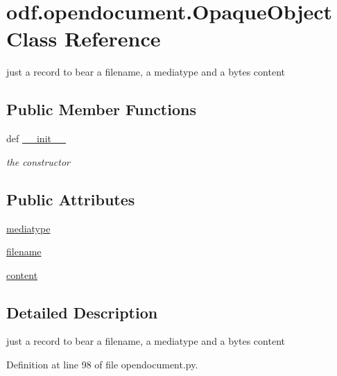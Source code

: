 \hypertarget{classodf_1_1opendocument_1_1OpaqueObject}{\section{odf.\+opendocument.\+Opaque\+Object Class Reference}
\label{classodf_1_1opendocument_1_1OpaqueObject}
}


just a record to bear a filename, a mediatype and a bytes content  


\subsection*{Public Member Functions}
\begin{DoxyCompactItemize}
\item 
def \hyperlink{classodf_1_1opendocument_1_1OpaqueObject_a554252db63a883d6ff087f78a22ac880}{\+\_\+\+\_\+init\+\_\+\+\_\+}
\begin{DoxyCompactList}\small\item\em the constructor \end{DoxyCompactList}\end{DoxyCompactItemize}
\subsection*{Public Attributes}
\begin{DoxyCompactItemize}
\item 
\hyperlink{classodf_1_1opendocument_1_1OpaqueObject_a4bbb2cc311a0c74ce3f62b2681b79d56}{mediatype}
\item 
\hyperlink{classodf_1_1opendocument_1_1OpaqueObject_af8f5a1a4e4daa535e72d304bfee40835}{filename}
\item 
\hyperlink{classodf_1_1opendocument_1_1OpaqueObject_ada08db06d347e302364e91f33926eb12}{content}
\end{DoxyCompactItemize}


\subsection{Detailed Description}
just a record to bear a filename, a mediatype and a bytes content 

Definition at line 98 of file opendocument.\+py.



